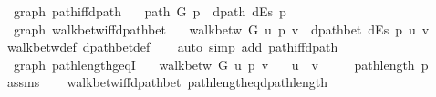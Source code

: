 \begin{isabellebody}
\ {\isacharparenleft}{\kern0pt}\ graph{\isacharparenright}{\kern0pt}\ path{\isacharunderscore}{\kern0pt}iff{\isacharunderscore}{\kern0pt}dpath{\isacharcolon}{\kern0pt}\isanewline
\ \ \ {\isachardoublequoteopen}path\ G\ p\ {\isasymlongleftrightarrow}\ dpath\ dEs\ p{\isachardoublequoteclose}\isanewline
%
\isadelimproof
\ \ %
\endisadelimproof
%
\isatagproof
{}\isamarkupfalse%
%
\endisatagproof
{\isafoldproof}%
%
\isadelimproof
\isanewline
%
\endisadelimproof
\isanewline
{}\isamarkupfalse%
\ {\isacharparenleft}{\kern0pt}\ graph{\isacharparenright}{\kern0pt}\ walk{\isacharunderscore}{\kern0pt}betw{\isacharunderscore}{\kern0pt}iff{\isacharunderscore}{\kern0pt}dpath{\isacharunderscore}{\kern0pt}bet{\isacharcolon}{\kern0pt}\isanewline
\ \ \ {\isachardoublequoteopen}walk{\isacharunderscore}{\kern0pt}betw\ G\ u\ p\ v\ {\isasymlongleftrightarrow}\ dpath{\isacharunderscore}{\kern0pt}bet\ dEs\ p\ u\ v{\isachardoublequoteclose}\isanewline
%
\isadelimproof
\ \ %
\endisadelimproof
%
\isatagproof
{}\isamarkupfalse%
\ walk{\isacharunderscore}{\kern0pt}betw{\isacharunderscore}{\kern0pt}def\ dpath{\isacharunderscore}{\kern0pt}bet{\isacharunderscore}{\kern0pt}def\isanewline
\ \ \isamarkupfalse%
\ {\isacharparenleft}{\kern0pt}auto\ simp\ add{\isacharcolon}{\kern0pt}\ path{\isacharunderscore}{\kern0pt}iff{\isacharunderscore}{\kern0pt}dpath{\isacharparenright}{\kern0pt}%
\endisatagproof
{\isafoldproof}%
%
\isadelimproof
\isanewline
%
\endisadelimproof
%
\isadeliminvisible
\isanewline
%
\endisadeliminvisible
%
\isataginvisible
{}\isamarkupfalse%
\ {\isacharparenleft}{\kern0pt}\ graph{\isacharparenright}{\kern0pt}\ path{\isacharunderscore}{\kern0pt}length{\isacharunderscore}{\kern0pt}geq{\isacharunderscore}{\kern0pt}{}I{\isacharcolon}{\kern0pt}\isanewline
\ \ \ {\isachardoublequoteopen}walk{\isacharunderscore}{\kern0pt}betw\ G\ u\ p\ v{\isachardoublequoteclose}\isanewline
\ \ \ {\isachardoublequoteopen}u\ {\isasymnoteq}\ v{\isachardoublequoteclose}\isanewline
\ \ \ {\isachardoublequoteopen}{}\ {\isasymle}\ path{\isacharunderscore}{\kern0pt}length\ p{\isachardoublequoteclose}%
\endisataginvisible
{\isafoldinvisible}%
%
\isadeliminvisible
\isanewline
%
\endisadeliminvisible
%
\isadelimproof
\ \ %
\endisadelimproof
%
\isatagproof
{}\isamarkupfalse%
\ assms\isanewline
\ \ \isamarkupfalse%
\ walk{\isacharunderscore}{\kern0pt}betw{\isacharunderscore}{\kern0pt}iff{\isacharunderscore}{\kern0pt}dpath{\isacharunderscore}{\kern0pt}bet\ path{\isacharunderscore}{\kern0pt}length{\isacharunderscore}{\kern0pt}eq{\isacharunderscore}{\kern0pt}dpath{\isacharunderscore}{\kern0pt}length\isanewline

\end{isabellebody}
